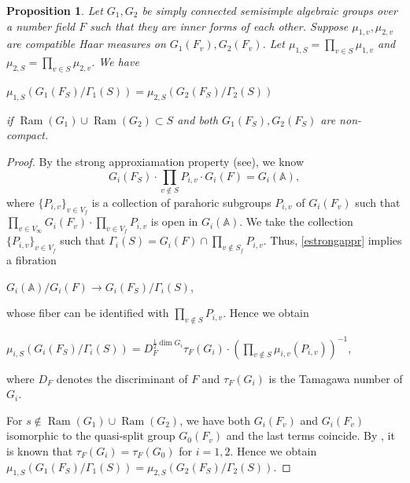 \documentclass[11pt]{article}
\theoremstyle{plain}
\newtheorem{proposition}[theorem]{Proposition}
\theoremstyle{remark}
\theoremstyle{definition}
\DeclareMathOperator{\ram}{Ram}
\begin{document}
\begin{proposition}\label{pStama}
Let $G_1,G_2$ be simply connected semisimple algebraic groups over a number field $F$ such that they are inner forms of each other. 
Suppose $\mu_{1,v},\mu_{2,v}$ are compatible Haar measures on $G_1(F_v),G_2(F_v)$. 
Let $\mu_{1,S}=\prod_{v\in S}\mu_{1,v}$ and $\mu_{2,S}=\prod_{v\in S}\mu_{2,v}$. 
We have
\begin{center}
    $\mu_{1,S}(G_{1}(F_S)/\Gamma_{1}(S))=\mu_{2,S}( G_{2}(F_S)/\Gamma_{2}(S))$
\end{center}
if $\ram(G_1)\cup \ram(G_2)\subset S$ and both $G_1(F_S),G_2(F_S)$ are non-compact.  
\end{proposition}
\begin{proof}
By the strong approxiamation property (see\cite[Theorem A]{Prasad77strongappr}), we know
\begin{equation}\label{estrongappr}
    G_{i}(F_S)\cdot \prod_{v\notin S}P_{i,v}\cdot G_{i}(F)=G_{i}(\mathbb{A}),
\end{equation}
where $\{P_{i,v}\}_{v\in V_f}$ is a collection of parahoric subgroups $P_{i,v}$ of $G_{i}(F_v)$ such that $\prod_{v\in V_{\infty}}G_{i}(F_v)\cdot \prod_{v\in V_f}P_{i,v}$ is open in $G_{i}(\mathbb{A})$. 
We take the collection $\{P_{i,v}\}_{v\in V_f}$ such that $\Gamma_{i}(S)=G_{i}(F)\cap \prod_{v\notin S_f}P_{i,v}$. 
Thus, \eqref{estrongappr} implies a fibration
\begin{center}
    $G_i(\mathbb{A})/G_{i}(F)\to G_{i}(F_S)/\Gamma_{i}(S)$,
\end{center}
whose fiber can be identified with $\prod_{v\notin S}P_{i,v}$. 
Hence we obtain
\begin{center}
    $\mu_{i,S}(G_{i}(F_S)/\Gamma_{i}(S))=D_{F}^{\frac{1}{2}\dim G_i}\tau_{F}(G_i)\cdot (\prod_{v\notin S}\mu_{i,v}(P_{i,v}))^{-1}$,
\end{center}
where $D_{F}$ denotes the discriminant of $F$ and $\tau_{F}(G_i)$ is the Tamagawa number of $G_i$. 

For $s\notin \ram(G_1)\cup \ram(G_2)$, we have both $G_{i}(F_v)$ and $G_{i}(F_v)$ isomorphic to the quasi-split group $G_{0}(F_v)$ and the last terms coincide. 
By \cite{Kott88}, it is known that $\tau_F(G_i)=\tau_F(G_0)$ for $i=1,2$. 
Hence we obtain $\mu_{1,S}( G_{1}(F_S)/\Gamma_{1}(S))=\mu_{2,S}(G_{2}(F_S)/\Gamma_{2}(S))$. 
\end{proof}
\end{document}
